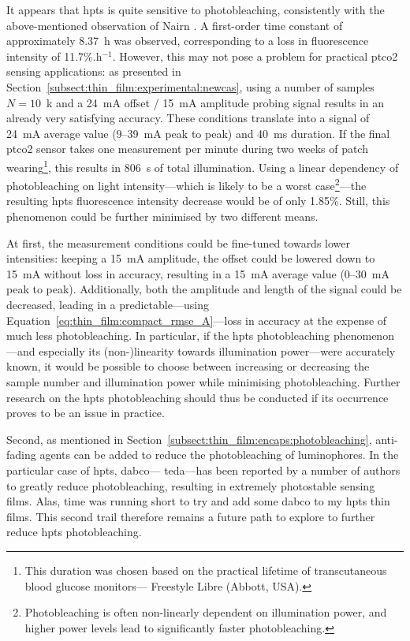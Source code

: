 It appears that \gls{hpts} is quite sensitive to photobleaching, consistently with the above-mentioned observation of Nairn \etal{}\cite{nairn2015}. A first-order time constant of approximately 8.37~h was observed, corresponding to a loss in fluorescence intensity of 11.7\%.h$^{-1}$. However, this may not pose a problem for practical \gls{ptco2} sensing applications: as presented in Section~\ref{subsect:thin_film:experimental:newcas}, using a number of samples $N=10$~k and a 24~mA offset / 15~mA amplitude probing signal results in an already very satisfying accuracy. These conditions translate into a signal of 24~mA average value (9--39~mA peak to peak) and 40~ms duration. If the final \gls{ptco2} sensor takes one measurement per minute during two weeks of patch wearing\footnote{This duration was chosen based on the practical lifetime of transcutaneous blood glucose monitors---\eg{} Freestyle Libre (Abbott, USA).}, this results in 806~s of total illumination. Using a linear dependency of photobleaching on light intensity---which is likely to be a worst case\footnote{Photobleaching is often non-linearly dependent on illumination power, and higher power levels lead to significantly faster photobleaching\cite{widengren1996, diaspro2006}.}---the resulting \gls{hpts} fluorescence intensity decrease would be of only 1.85\%. Still, this phenomenon could be further minimised by two different means.

At first, the measurement conditions could be fine-tuned towards lower intensities: keeping a 15~mA amplitude, the offset could be lowered down to 15~mA without loss in accuracy, resulting in a 15~mA average value (0--30~mA peak to peak). Additionally, both the amplitude and length of the signal could be decreased, leading in a predictable---using Equation~\ref{eq:thin_film:compact_rmse_A}---loss in accuracy at the expense of much less photobleaching. In particular, if the \gls{hpts} photobleaching phenomenon---and especially its (non-)linearity towards illumination power---were accurately known, it would be possible to choose between increasing or decreasing the sample number and illumination power while minimising photobleaching. \mfrin{}Further research on the \gls{hpts} photobleaching should thus be conducted if its occurrence proves to be an issue in practice.

Second, as mentioned in Section~\ref{subsect:thin_film:encaps:photobleaching}, anti-fading agents can be added to reduce the photobleaching of luminophores. In the particular case of \gls{hpts}, \gls{dabco}---\aka{} \gls{teda}---has been reported by a number of authors to greatly reduce photobleaching, resulting in extremely photostable sensing films\cite{goicoechea2007, duong2019}. Alas, time was running short to try and add some \gls{dabco} to my \gls{hpts} thin films. This second trail therefore remains a \mfrin{}future path to explore to further reduce \gls{hpts} photobleaching.

